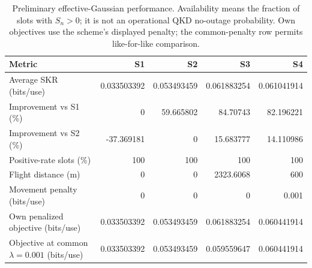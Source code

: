 \begin{table}[t]
\caption{Preliminary effective-Gaussian performance. Availability means the fraction of slots with $S_n>0$; it is not an operational QKD no-outage probability. Own objectives use the scheme's displayed penalty; the common-penalty row permits like-for-like comparison.}
\label{tab:mobility_performance}
\centering\footnotesize
\begin{tabular}{lrrrr}\hline
Metric & S1 & S2 & S3 & S4 \\ \hline
Average SKR (bits/use) & 0.033503392 & 0.053493459 & 0.061883254 & 0.061041914 \\
Improvement vs S1 (\%) & 0 & 59.665802 & 84.70743 & 82.196221 \\
Improvement vs S2 (\%) & -37.369181 & 0 & 15.683777 & 14.110986 \\
Positive-rate slots (\%) & 100 & 100 & 100 & 100 \\
Flight distance (m) & 0 & 0 & 2323.6068 & 600 \\
Movement penalty (bits/use) & 0 & 0 & 0 & 0.001 \\
Own penalized objective (bits/use) & 0.033503392 & 0.053493459 & 0.061883254 & 0.060441914 \\
Objective at common $\lambda=0.001$ (bits/use) & 0.033503392 & 0.053493459 & 0.059559647 & 0.060441914 \\
\hline\end{tabular}
\end{table}
